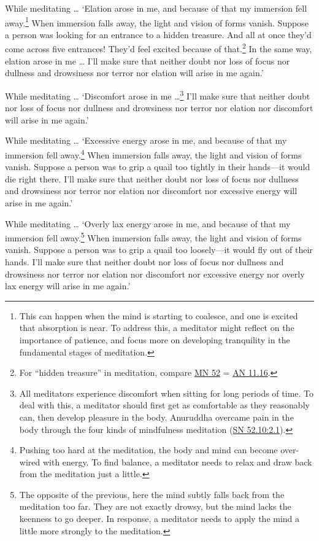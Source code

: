\documentclass[12pt,openany]{book}%
\begin{document}
While meditating … ‘Elation arose in me, and because of that my immersion fell away.\footnote{This can happen when the mind is starting to coalesce, and one is excited that absorption is near. To address this, a meditator might reflect on the importance of patience, and focus more on developing tranquility in the fundamental stages of meditation. } When immersion falls away, the light and vision of forms vanish. Suppose a person was looking for an entrance to a hidden treasure. And all at once they’d come across five entrances! They’d feel excited because of that.\footnote{For “hidden treasure” in meditation, compare \href{https://suttacentral.net/mn52/en/sujato}{MN 52} = \href{https://suttacentral.net/an11.16/en/sujato}{AN 11.16}. } In the same way, elation arose in me … I’ll make sure that neither doubt nor loss of focus nor dullness and drowsiness nor terror nor elation will arise in me again.’ 

While meditating … ‘Discomfort arose in me …\footnote{All meditators experience discomfort when sitting for long periods of time. To deal with this, a meditator should first get as comfortable as they reasonably can, then develop pleasure in the body. Anuruddha overcame pain in the body through the four kinds of mindfulness meditation (\href{https://suttacentral.net/sn52.10/en/sujato\#2.1}{SN 52.10:2.1}). } I’ll make sure that neither doubt nor loss of focus nor dullness and drowsiness nor terror nor elation nor discomfort will arise in me again.’ 

While meditating … ‘Excessive energy arose in me, and because of that my immersion fell away.\footnote{Pushing too hard at the meditation, the body and mind can become over-wired with energy. To find balance, a meditator needs to relax and draw back from the meditation just a little. } When immersion falls away, the light and vision of forms vanish. Suppose a person was to grip a quail too tightly in their hands—it would die right there. I’ll make sure that neither doubt nor loss of focus nor dullness and drowsiness nor terror nor elation nor discomfort nor excessive energy will arise in me again.’ 

While meditating … ‘Overly lax energy arose in me, and because of that my immersion fell away.\footnote{The opposite of the previous, here the mind subtly falls back from the meditation too far. They are not exactly drowsy, but the mind lacks the keenness to go deeper. In response, a meditator needs to apply the mind a little more strongly to the meditation. } When immersion falls away, the light and vision of forms vanish. Suppose a person was to grip a quail too loosely—it would fly out of their hands. I’ll make sure that neither doubt nor loss of focus nor dullness and drowsiness nor terror nor elation nor discomfort nor excessive energy nor overly lax energy will arise in me again.’ 
\end{document}
